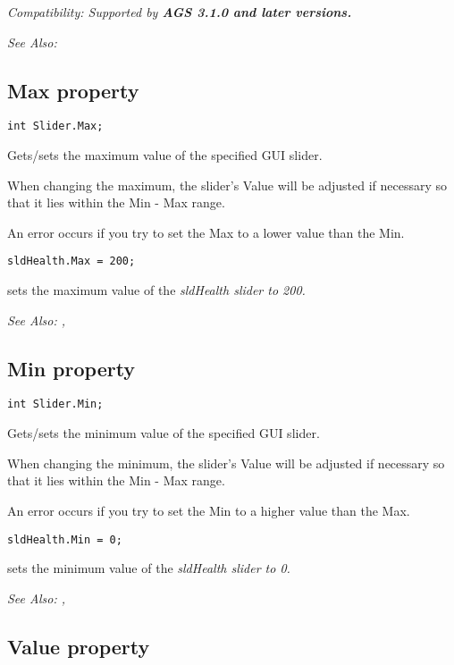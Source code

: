 \it{Compatibility:} Supported by \bf{AGS 3.1.0} and later versions.

\it{See Also:} 


\subsection{Max property}\label{Slider.Max}%

\begin{verbatim}
int Slider.Max;
\end{verbatim}
Gets/sets the maximum value of the specified GUI slider.

When changing the maximum, the slider's Value will be adjusted if
necessary so that it lies within the Min - Max range.

An error occurs if you try to set the Max to a lower value than the Min.

\begin{verbatim}
sldHealth.Max = 200;
\end{verbatim}
sets the maximum value of the \it{sldHealth} slider to 200.

\it{See Also:} ,


\subsection{Min property}\label{Slider.Min}%

\begin{verbatim}
int Slider.Min;
\end{verbatim}
Gets/sets the minimum value of the specified GUI slider.

When changing the minimum, the slider's Value will be adjusted if
necessary so that it lies within the Min - Max range.

An error occurs if you try to set the Min to a higher value than the Max.

\begin{verbatim}
sldHealth.Min = 0;
\end{verbatim}
sets the minimum value of the \it{sldHealth} slider to 0.

\it{See Also:} ,


\subsection{Value property}\label{Slider.Value}%

